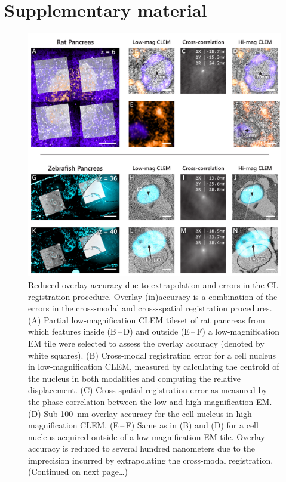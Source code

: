 \clearpage

\renewcommand\thesection{\arabic{chapter}.\Alph{section}}
\setcounter{section}{0}
\section{Supplementary material}
\label{sec:3_supplement}

\renewcommand{\thefigure}{3.A\arabic{figure}}
\setcounter{figure}{0}



\begin{figure}[!tbh]
    \centering
    \includegraphics[width=\linewidth]{chapter-3/figures_PDF/fig3-S1_misalignment.pdf}
    \caption{Reduced overlay accuracy due to extrapolation and errors in the CL registration procedure. Overlay (in)accuracy is a combination of the errors in the cross-modal and cross-spatial registration procedures.
    (A) Partial low-magnification CLEM tileset of rat pancreas from which features inside (B\,--\,D) and outside (E\,--\,F) a low-magnification EM tile were selected to assess the overlay accuracy (denoted by white squares).
    (B) Cross-modal registration error for a cell nucleus in low-magnification CLEM, measured by calculating the centroid of the nucleus in both modalities and computing the relative displacement.
    (C) Cross-spatial registration error as measured by the phase correlation between the low and high-magnification EM.
    (D) Sub-\SI{100}{\nano\meter} overlay accuracy for the cell nucleus in high-magnification CLEM.
    (E\,--\,F) Same as in (B) and (D) for a cell nucleus acquired outside of a low-magnification EM tile. Overlay accuracy is reduced to several hundred nanometers due to the imprecision incurred by extrapolating the cross-modal registration.
    (Continued on next page\ldots)}
    \label{fig:3.S1_misalignment}
\end{figure}
